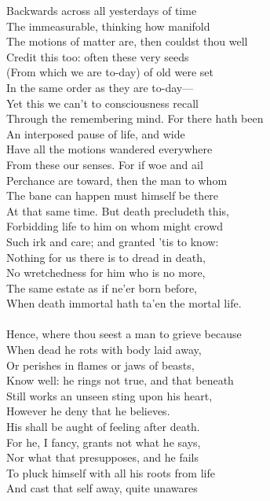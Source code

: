 Backwards across all yesterdays of time\\
The immeasurable, thinking how manifold\\
The motions of matter are, then couldst thou well\\
Credit this too: often these very seeds\\
(From which we are to-day) of old were set\\
In the same order as they are to-day—\\
Yet this we can't to consciousness recall\\
Through the remembering mind. For there hath been\\
An interposed pause of life, and wide\\
Have all the motions wandered everywhere\\
From these our senses. For if woe and ail\\
Perchance are toward, then the man to whom\\
The bane can happen must himself be there\\
At that same time. But death precludeth this,\\
Forbidding life to him on whom might crowd\\
Such irk and care; and granted 'tis to know:\\
Nothing for us there is to dread in death,\\
No wretchedness for him who is no more,\\
The same estate as if ne'er born before,\\
When death immortal hath ta'en the mortal life.\\
\\
Hence, where thou seest a man to grieve because\\
When dead he rots with body laid away,\\
Or perishes in flames or jaws of beasts,\\
Know well: he rings not true, and that beneath\\
Still works an unseen sting upon his heart,\\
However he deny that he believes.\\
His shall be aught of feeling after death.\\
For he, I fancy, grants not what he says,\\
Nor what that presupposes, and he fails\\
To pluck himself with all his roots from life\\
And cast that self away, quite unawares\\
